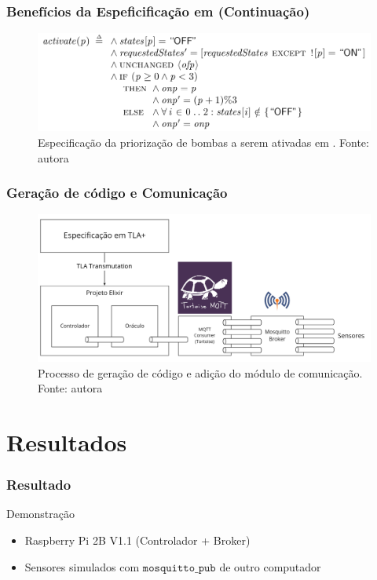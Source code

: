 \documentclass{beamer}
\begin{document}
    \begin{frame}
    \frametitle{Benefícios da Espeficificação em \TLA (Continuação)}

      \begin{figure}
  \includegraphics[width=\textwidth]{activate_tla.png}
  \caption{Especificação da priorização de bombas a serem ativadas em \TLA.
    Fonte: autora}
      \end{figure}


  \end{frame}
  
    \begin{frame}
    \frametitle{Geração de código e Comunicação}

      \begin{figure}
  \includegraphics[width=\textwidth]{diagrama.png}
  \caption{Processo de geração de código e adição do módulo de comunicação.
    Fonte: autora}
      \end{figure}


  \end{frame}

\section{Resultados}
  
  \begin{frame}
    \frametitle{Resultado}

    Demonstração
    \begin{itemize}
    \item Raspberry Pi 2B V1.1 (Controlador + Broker)
    \item Sensores simulados com $\texttt{mosquitto\_pub}$ de outro computador
      \end{itemize}
      \end{frame}
  
\end{document}
